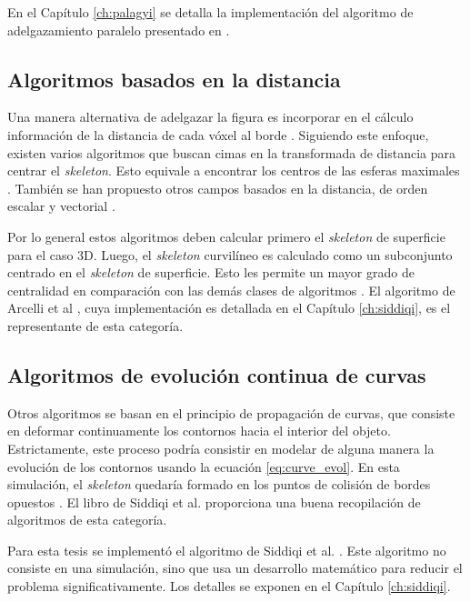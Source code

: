 En el Capítulo \ref{ch:palagyi} se detalla la implementación del algoritmo de adelgazamiento paralelo presentado en \cite{palagyi1999parallel}.

\subsection{Algoritmos basados en la distancia}

Una manera alternativa de adelgazar la figura es incorporar en el cálculo información de la distancia de cada vóxel al borde \cite{pudney1998distance}. Siguiendo este enfoque, existen varios algoritmos que buscan cimas en la transformada de distancia para centrar el \textit{skeleton}. Esto equivale a encontrar los centros de las esferas maximales \cite{di1994well,pudney1998distance,perchet2004advanced}. También se han propuesto otros campos basados en la distancia, de orden escalar \cite{ahuja1997shape,go1997extraction} y vectorial \cite{cornea2005computing,hassouna2009variational,short2013spatial}.

Por lo general estos algoritmos deben calcular primero el \textit{skeleton} de superficie para el caso 3D. Luego, el \textit{skeleton} curvilíneo es calculado como un subconjunto centrado en el \textit{skeleton} de superficie. Esto les permite un mayor grado de centralidad en comparación con las demás clases de algoritmos \cite{tagliasacchi2012mean}. El algoritmo de Arcelli et al \cite{arcelli2011distance}, cuya implementación es detallada en el Capítulo \ref{ch:siddiqi}, es el representante de esta categoría.

\subsection{Algoritmos de evolución continua de curvas}

Otros algoritmos se basan en el principio de propagación de curvas, que consiste en deformar continuamente los contornos hacia el interior del objeto. Estrictamente, este proceso podría consistir en modelar de alguna manera la evolución de los contornos usando la ecuación \ref{eq:curve_evol}. En esta simulación, el \textit{skeleton} quedaría formado en los puntos de colisión de bordes opuestos \cite{kimmel1995skeletonization,leymarie2003three}. El libro de Siddiqi et al. \cite{siddiqi2008medial} proporciona una buena recopilación de algoritmos de esta categoría.

Para esta tesis se implementó el algoritmo de Siddiqi et al. \cite{siddiqi2002hamilton}. Este algoritmo no consiste en una simulación, sino que usa un desarrollo matemático para reducir el problema significativamente. Los detalles se exponen en el Capítulo \ref{ch:siddiqi}.


